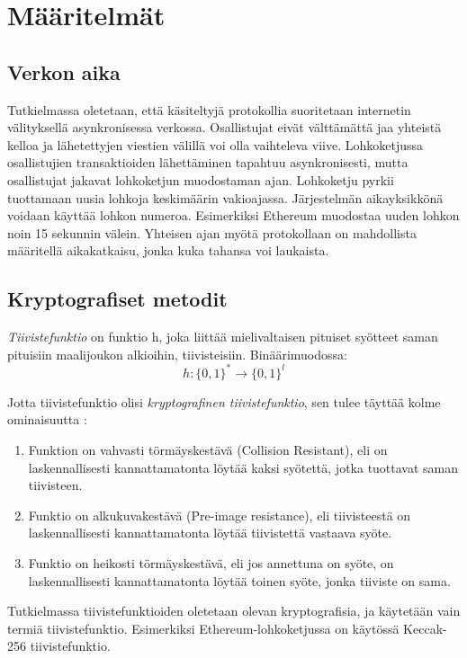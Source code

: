\chapter{Määritelmät\label{methods}}

\section{Verkon aika}
Tutkielmassa oletetaan, että käsiteltyjä protokollia suoritetaan internetin välityksellä asynkronisessa verkossa. Osallistujat eivät välttämättä jaa yhteistä kelloa ja lähetettyjen viestien välillä voi olla vaihteleva viive. Lohkoketjussa osallistujien transaktioiden lähettäminen tapahtuu asynkronisesti, mutta osallistujat jakavat lohkoketjun muodostaman ajan. Lohkoketju pyrkii tuottamaan uusia lohkoja keskimäärin vakioajassa. Järjestelmän aikayksikkönä voidaan käyttää lohkon numeroa. Esimerkiksi Ethereum muodostaa uuden lohkon noin 15 sekunnin välein. Yhteisen ajan myötä protokollaan on mahdollista määritellä aikakatkaisu, jonka kuka tahansa voi laukaista.


\section{Kryptografiset metodit}
\textit{Tiivistefunktio} on funktio h, joka liittää mielivaltaisen pituiset syötteet saman pituisiin maalijoukon alkioihin, tiivisteisiin. Binäärimuodossa: 
\begin{equation}
    h : \{0, 1\}^* \longrightarrow  \{0, 1\}^l
\end{equation}

Jotta tiivistefunktio olisi \textit{kryptografinen tiivistefunktio}, sen tulee täyttää kolme ominaisuutta \cite{cryptoeprint:2011:565}: 
\begin{enumerate}
    \item Funktion on vahvasti törmäyskestävä (Collision Resistant), eli on laskennallisesti kannattamatonta löytää kaksi syötettä, jotka tuottavat saman tiivisteen.
    \item Funktio on alkukuvakestävä (Pre-image resistance), eli tiivisteestä on laskennallisesti kannattamatonta löytää tiivistettä vastaava syöte.
    \item Funktio on heikosti törmäyskestävä, eli jos annettuna on syöte, on laskennallisesti kannattamatonta löytää toinen syöte, jonka tiiviste on sama.
\end{enumerate}

Tutkielmassa tiivistefunktioiden oletetaan olevan kryptografisia, ja käytetään vain termiä tiivistefunktio. Esimerkiksi Ethereum-lohkoketjussa on käytössä Keccak-256 tiivistefunktio.

